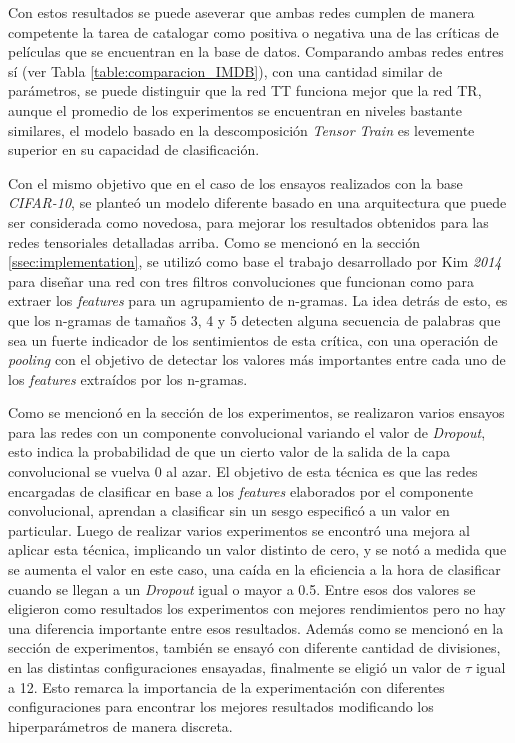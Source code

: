 \documentclass[spanish]{article}
\theoremstyle{definition}
\theoremstyle{remark}
\numberwithin{equation}{section}
\numberwithin{equation}{section} %
\begin{document}
\par
Con estos resultados se puede aseverar que ambas redes cumplen de manera competente la tarea de catalogar como positiva o negativa una de las críticas de películas que se encuentran en la base de datos. Comparando ambas redes entres sí (ver Tabla \ref{table:comparacion_IMDB}), con una cantidad similar de parámetros, se puede distinguir que la red TT funciona mejor que la red TR, aunque el promedio de los experimentos se encuentran en niveles bastante similares, el modelo basado en la descomposición \textit{Tensor Train} es levemente superior en su capacidad de clasificación. 
\par
Con el mismo objetivo que en el caso de los ensayos realizados con la base \textit{CIFAR-10}, se planteó un modelo diferente basado en una arquitectura que puede ser considerada como novedosa, para mejorar los resultados obtenidos para las redes tensoriales detalladas arriba. Como se mencionó en la sección \ref{ssec:implementation}, se utilizó como base el trabajo desarrollado por Kim\textit{ 2014} \cite{kim2014convolutional} para diseñar una red con tres filtros convoluciones que funcionan como para extraer los \textit{features} para un agrupamiento de n-gramas. La idea detrás de esto, es que los n-gramas de tamaños 3, 4 y 5 detecten alguna secuencia de palabras que sea un fuerte indicador de los sentimientos de esta crítica, con una operación de \textit{pooling} con el objetivo de detectar los valores más importantes entre cada uno de los \textit{features} extraídos por los n-gramas. 
\par
Como se mencionó en la sección de los experimentos, se realizaron varios ensayos para las redes con un componente convolucional variando el valor de \textit{Dropout}, esto indica la probabilidad de que un cierto valor de la salida de la capa convolucional se vuelva 0 al azar. El objetivo de esta técnica es que las redes encargadas de clasificar en base a los \textit{features} elaborados por el componente convolucional, aprendan a clasificar sin un sesgo especificó a un valor en particular. Luego de realizar varios experimentos se encontró una mejora al aplicar esta técnica, implicando un valor distinto de cero, y se notó a medida que se aumenta el valor en este caso, una caída en la eficiencia a la hora de clasificar cuando se llegan a un \textit{Dropout} igual o mayor a 0.5. Entre esos dos valores se eligieron como resultados los experimentos con mejores rendimientos pero no hay una diferencia importante entre esos resultados. Además como se mencionó en la sección de experimentos, también se ensayó con diferente cantidad de divisiones, en las distintas configuraciones ensayadas, finalmente se eligió un valor de $\tau$ igual a 12. Esto remarca la importancia de la experimentación con diferentes configuraciones para encontrar los mejores resultados modificando los hiperparámetros de manera discreta.
\end{document}
